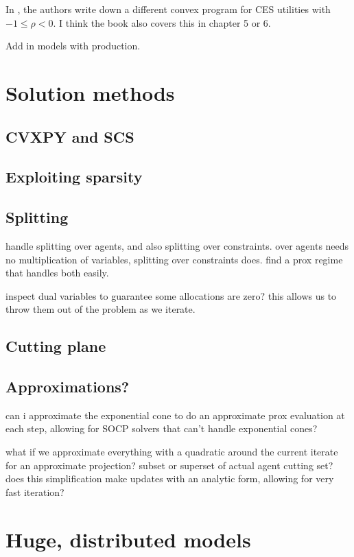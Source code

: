 \documentclass{article}
\begin{document}
In \cite{codenotti2005marketCES, codenotti2005market}, the authors write down a different convex program for CES utilities with $-1 \leq \rho < 0$. I think the book \cite{nisan2007algorithmic} also covers this in chapter 5 or 6.

Add in models with production.


\section{Solution methods}

\subsection{CVXPY and SCS}
\subsection{Exploiting sparsity}
\subsection{Splitting}
handle splitting over agents, and also splitting over constraints. over agents needs no multiplication of variables, splitting over constraints does. find a prox regime that handles both easily.

inspect dual variables to guarantee some allocations are zero? this allows us to throw them out of the problem as we iterate.

\subsection{Cutting plane}
\subsection{Approximations?}
can i approximate the exponential cone to do an approximate prox evaluation
at each step, allowing for SOCP solvers that can't handle exponential cones?

what if we approximate everything with a quadratic around the current iterate for an approximate projection? subset or superset of actual agent cutting set? does this simplification make updates with an analytic form, allowing for very fast iteration?

\section{Huge, distributed models}

\newpage


\end{document}
